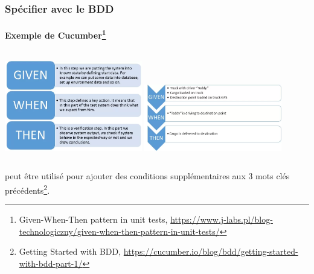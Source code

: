 \documentclass{beamer}
\begin{document}
    \begin{frame}
        \frametitle{Spécifier avec le BDD}
        \framesubtitle{Exemple de Cucumber\footnote{Given-When-Then pattern in unit tests, \url{https://www.j-labs.pl/blog-technologiczny/given-when-then-pattern-in-unit-tests/}}}
        \transdissolve
        \begin{columns}
            \centering
            \includegraphics[width=6cm]{image/given-when-then}
            \centering
            \includegraphics[width=6cm]{image/given-when-then-exemple}
        \end{columns}
         peut être utilisé pour ajouter des conditions supplémentaires aux 3 mots clés précédents\footnote{Getting Started with BDD, \url{https://cucumber.io/blog/bdd/getting-started-with-bdd-part-1/}}.
    \end{frame}
\end{document}

